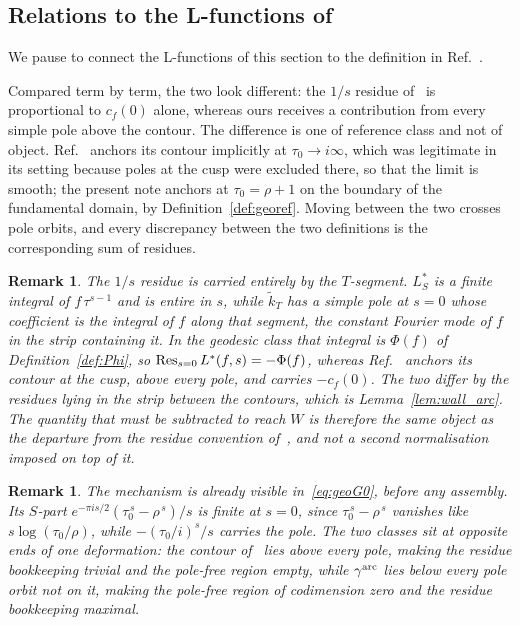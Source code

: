 \documentclass[11pt]{article}
\newtheorem{remark}[theorem]{Remark}
\newcommand{\tk}{\widetilde{k}_T}
\begin{document}
\subsection{Relations to the L-functions of~\cite{1806}}\label{sec:arc1806}

We pause to connect the L-functions of this section to the definition in Ref.~\cite{1806}.

Compared term by term, the two look different: the $1/s$ residue of~\cite{1806} is proportional to
$c_f(0)$ alone, whereas ours receives a contribution from every simple pole above the contour. The
difference is one of reference class and not of object. Ref.~\cite{1806} anchors its contour
implicitly at $\tau_0\to i\infty$, which was legitimate in its setting because poles at the cusp
were excluded there, so that the limit is smooth; the present note anchors at $\tau_0=\rho+1$ on
the boundary of the fundamental domain, by Definition~\ref{def:georef}. Moving between the two
crosses pole orbits, and every discrepancy between the two definitions is the corresponding sum of
residues.

\begin{remark}\label{rem:arcresidue}
\emph{The $1/s$ residue is carried entirely by the $T$-segment. $L^*_S$ is a finite integral of
$f\,\tau^{s-1}$ and is entire in $s$, while $\tk$ has a simple pole at $s=0$ whose coefficient is
the integral of $f$ along that segment, the constant Fourier mode of $f$ in the strip containing
it. In the geodesic class that integral is $\Phi(f)$ of Definition~\ref{def:Phi}, so
$\mathop{\rm Res}_{s=0}L^*(f,s)=-\Phi(f)$, whereas Ref.~\cite{1806} anchors its contour at the cusp,
above every pole, and carries $-c_f(0)$. The two differ by the residues lying in the strip between
the contours, which is Lemma~\ref{lem:wall_arc}. The quantity that must be subtracted to reach $W$
is therefore the same object as the departure from the residue convention of~\cite{1806}, and not a
second normalisation imposed on top of it.}
\end{remark}

\begin{remark}\label{rem:arcextremal}
\emph{The mechanism is already visible in~\eqref{eq:geoG0}, before any assembly. Its $S$-part
$e^{-\pi is/2}(\tau_0^{\,s}-\rho^{\,s})/s$ is finite at $s=0$, since $\tau_0^{\,s}-\rho^{\,s}$
vanishes like $s\log(\tau_0/\rho)$, while $-(\tau_0/i)^{s}/s$ carries the pole. The two classes sit
at opposite ends of one deformation: the contour of~\cite{1806} lies above every pole, making the
residue bookkeeping trivial and the pole-free region empty, while $\gamma^{\rm arc}$ lies below
every pole orbit not on it, making the pole-free region of codimension zero and the residue
bookkeeping maximal.}
\end{remark}
\end{document}
